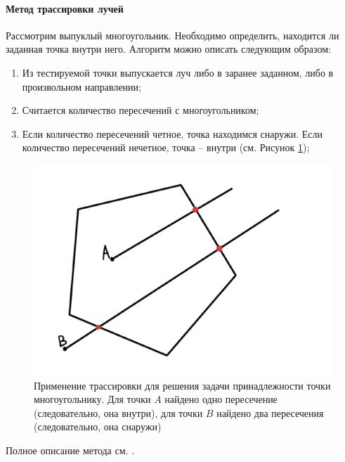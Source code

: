 \paragraph{Метод трассировки лучей}
Рассмотрим выпуклый многоугольник. Необходимо определить, находится ли заданная точка внутри него. Алгоритм можно описать следующим образом:
\begin{enumerate}
	\item Из тестируемой точки выпускается луч либо в заранее заданном, либо в произвольном направлении;
	\item Считается количество пересечений с многоугольником;
	\item Если количество пересечений четное, точка находимся снаружи. Если количество пересечений нечетное, точка – внутри (см. Рисунок \ref{trace_method});
\end{enumerate}
\begin{figure}[H]
	\centering
	\includegraphics[width=.6\linewidth,trim={2cm 2cm 5cm 2cm}]{img/gmtrace}
	\caption{Применение трассировки для решения задачи принадлежности точки многоугольнику. Для точки $A$ найдено одно пересечение (следовательно, она внутри), для точки $B$ найдено два пересечения (следовательно, она снаружи)}
	\label{trace_method}
\end{figure}

Полное описание метода см. \cite{pnpoly}.